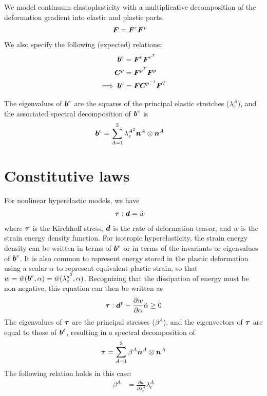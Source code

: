 \documentclass[10pt]{article}
\begin{document}
We model continuum elastoplasticity with a multiplicative decomposition of the deformation gradient into elastic and plastic parts.
\begin{align}
\mbox{\boldmath$ F$} &= \mbox{\boldmath$ F$}^e \mbox{\boldmath$ F$}^p
\end{align}
We also specify the following (expected) relations:
\begin{align}
\mbox{\boldmath$ b$}^e &= \mbox{\boldmath$ F$}^e \mbox{\boldmath$ F$}^{e^T}\\
\mbox{\boldmath$ C$}^p &= \mbox{\boldmath$ F$}^{p^T} \mbox{\boldmath$ F$}^p\\
\implies \mbox{\boldmath$ b$}^e &= \mbox{\boldmath$ F$}\mbox{\boldmath$ C$}^{p^{-1}}\mbox{\boldmath$ F$}^T
\end{align}

The eigenvalues of $\mbox{\boldmath$ b$}^e$ are the squares of the principal elastic stretches ($\lambda^A_e$), and the associated spectral decomposition of $\mbox{\boldmath$ b$}^e$ is
\begin{align}
\mbox{\boldmath$ b$}^e &= \sum_{A=1}^3 \lambda_e^{A^2} \mbox{\boldmath$ n$}^A \otimes \mbox{\boldmath$ n$}^A
\end{align}

\section{Constitutive laws}

For nonlinear hyperelastic models, we have
\begin{align}
\mbox{\boldmath$\tau$}:\mbox{\boldmath$ d$} &= \dot{w}
\end{align}
where $\mbox{\boldmath$\tau$}$ is the Kirchhoff stress, $\mbox{\boldmath$ d$}$ is the rate of deformation tensor, and $w$ is the strain energy density function. For isotropic hyperelasticity, the strain energy density can be written in terms of $\mbox{\boldmath$ b$}^e$ or in terms of the invariants or eigenvalues of $\mbox{\boldmath$ b$}^e$. It is also common to represent energy stored in the plastic deformation using a scalar $\alpha$ to represent equivalent plastic strain, so that $w = \hat{w}(\mbox{\boldmath$ b$}^e,\alpha) = \bar{w}(\lambda_e^{a^2},\alpha)$. Recognizing that the dissipation of energy must be non-negative, this equation can then be written as
\begin{align}
\mbox{\boldmath$\tau$}:\mbox{\boldmath$ d$}^p - \frac{\partial w}{\partial \alpha} \dot{\alpha} \geq 0
\end{align}
The eigenvalues of $\mbox{\boldmath$\tau$}$ are the principal stresses ($\beta^A$), and the eigenvectors of $\mbox{\boldmath$\tau$}$ are equal to those of $\mbox{\boldmath$ b$}^e$, resulting in a spectral decomposition of
\begin{align}
\mbox{\boldmath$\tau$} = \sum_{A=1}^3 \beta^A \mbox{\boldmath$ n$}^A \otimes \mbox{\boldmath$ n$}^A
\end{align}
The following relation holds in this case:
\begin{align}
\beta^A &= \frac{\partial \bar{w}}{\partial \lambda_e^{A}}\lambda_e^{A}
\end{align}
\end{document}
